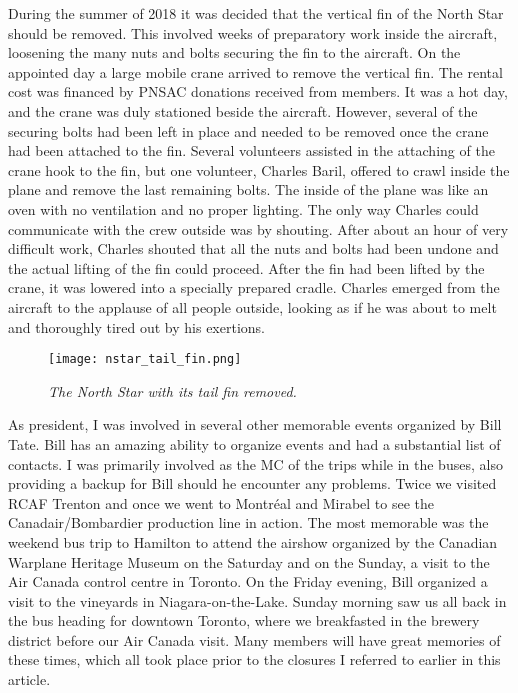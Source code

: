 During the summer of 2018 it was decided that the vertical fin of the North Star should be removed.  This involved weeks of preparatory work inside the aircraft, loosening the many nuts and bolts securing the fin to the aircraft.  On the appointed day a large mobile crane arrived to remove the vertical fin. The rental cost was financed by PNSAC donations received from members.  It was a hot day, and the crane was duly stationed beside the aircraft.  However, several of the securing bolts had been left in place and needed to be removed once the crane had been attached to the fin.  Several volunteers assisted in the attaching of the crane hook to the fin, but one volunteer, Charles Baril, offered to crawl inside the plane and remove the last remaining bolts.  The inside of the plane was like an oven with no ventilation and no proper lighting. The only way Charles could communicate with the crew outside was by shouting.  After about an hour of very difficult work, Charles shouted that all the nuts and bolts had been undone and the actual lifting of the fin could proceed.  After the fin had been lifted by the crane, it was lowered into a specially prepared cradle. Charles emerged from the aircraft to the applause of all people outside, looking as if he was about to melt and thoroughly tired out by his exertions.

\begin{figure}[H]
   \vspace{2em}
   \centering
   \texttt{[image: nstar\_tail\_fin.png]}
   \caption*{\small \em The North Star with its tail fin removed.}
   \label{fig:img1}
\end{figure}

 As president, I was involved in several other memorable events organized by Bill Tate.  Bill has an amazing ability to organize events and had a substantial list of contacts.  I was primarily involved as the MC of the trips while in the buses, also providing a backup for Bill should he encounter any problems.  Twice we visited RCAF Trenton and once we went to Montréal and Mirabel to see the Canadair/Bombardier production line in action. The most memorable was the weekend bus trip to Hamilton to attend the airshow organized by the Canadian Warplane Heritage Museum on the Saturday and on the Sunday, a visit to the Air Canada control centre in Toronto. On the Friday evening, Bill organized a visit to the vineyards in Niagara-on-the-Lake. Sunday morning saw us all back in the bus heading for downtown Toronto, where we breakfasted in the brewery district before our Air Canada visit.   Many members will have great memories of these times, which all took place prior to the closures I referred to earlier in this article. 
 
